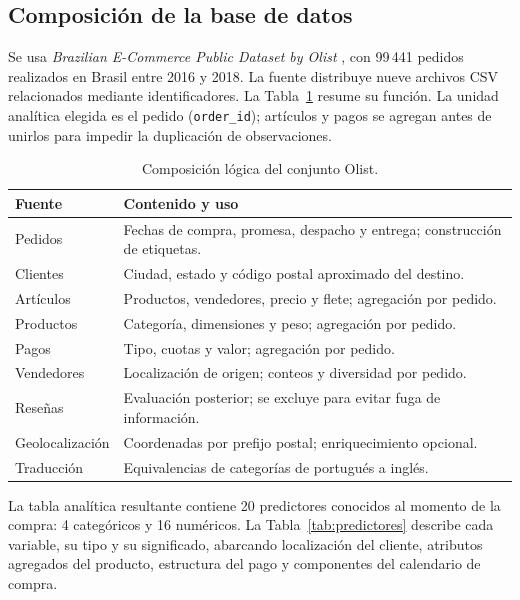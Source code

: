 \documentclass[journal]{IEEEtran}
\begin{document}
\subsection{Composición de la base de datos}
Se usa \emph{Brazilian E-Commerce Public Dataset by Olist} \cite{olist2018dataset}, con 99\,441 pedidos realizados en Brasil entre 2016 y 2018. La fuente distribuye nueve archivos CSV relacionados mediante identificadores. La Tabla~\ref{tab:datos} resume su función. La unidad analítica elegida es el pedido (\texttt{order\_id}); artículos y pagos se agregan antes de unirlos para impedir la duplicación de observaciones.

\begin{table}[t]
\caption{Composición lógica del conjunto Olist.}
\label{tab:datos}
\centering\scriptsize
\begin{tabular}{p{2.5cm}p{5.1cm}}
\toprule
Fuente & Contenido y uso \\
\midrule
Pedidos & Fechas de compra, promesa, despacho y entrega; construcción de etiquetas. \\
Clientes & Ciudad, estado y código postal aproximado del destino. \\
Artículos & Productos, vendedores, precio y flete; agregación por pedido. \\
Productos & Categoría, dimensiones y peso; agregación por pedido. \\
Pagos & Tipo, cuotas y valor; agregación por pedido. \\
Vendedores & Localización de origen; conteos y diversidad por pedido. \\
Reseñas & Evaluación posterior; se excluye para evitar fuga de información. \\
Geolocalización & Coordenadas por prefijo postal; enriquecimiento opcional. \\
Traducción & Equivalencias de categorías de portugués a inglés. \\
\bottomrule
\end{tabular}
\end{table}

La tabla analítica resultante contiene 20 predictores conocidos al momento de la compra: 4 categóricos y 16 numéricos. La Tabla~\ref{tab:predictores} describe cada variable, su tipo y su significado, abarcando localización del cliente, atributos agregados del producto, estructura del pago y componentes del calendario de compra.
\end{document}
